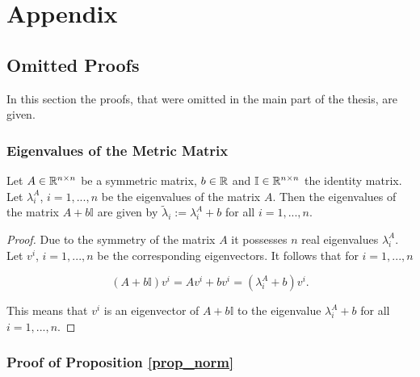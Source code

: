 \appendix
\section{Appendix}

\subsection{Omitted Proofs}

In this section the proofs, that were omitted in the main part of the thesis, are given.

\subsubsection{Eigenvalues of the Metric Matrix}
\label{proof_eigval}

\begin{proposition}
		Let \(A \in \mathbb{R}^{n\times n}\) be a symmetric matrix, \(b \in \mathbb{R}\) and \(\mathbb{I} \in \mathbb{R}^{n\times n}\) the identity matrix.
		Let \(\lambda^A_i\), \(i = 1,...,n\) be the eigenvalues of the matrix \(A\). Then the eigenvalues of the matrix \(A+b\mathbb{I}\) are given by \(\tilde{\lambda}_i := \lambda^A_i + b\) for all \(i = 1,...,n\).
\end{proposition}

\begin{proof}
	Due to the symmetry of the matrix \(A\) it possesses  \(n\) real eigenvalues \(\lambda^A_i\).
	Let \(v^i\), \(i = 1,...,n\) be the corresponding eigenvectors. It follows that for \(i = 1,...,n\)
	
	\[ (A+b\mathbb{I})v^i = Av^i+bv^i = (\lambda_i^A + b)v^i. \]
	
	This means that \(v^i\) is an eigenvector of \(A+b\mathbb{I}\) to the eigenvalue \(\lambda_i^A + b\) for all \(i = 1,...,n\).
\end{proof}

\subsubsection{Proof of Proposition \ref{prop_norm}}
\label{proof_norm}

